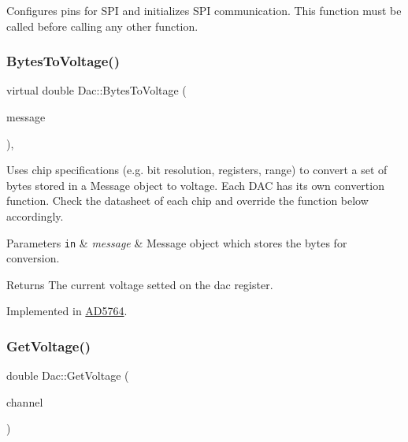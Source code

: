 Configures pins for S\+PI and initializes S\+PI communication. This function must be called before calling any other function. \mbox{\label{classDac_a1df39dc8c6e5b50afd07b6dd8a6b9300}} 
\subsubsection{\texorpdfstring{Bytes\+To\+Voltage()}{BytesToVoltage()}}
{\footnotesize\ttfamily virtual double Dac\+::\+Bytes\+To\+Voltage (\begin{DoxyParamCaption}\item[{\mbox{\hyperlink{structspi__utils_1_1Message}{spi\+\_\+utils\+::\+Message}}}]{message }\end{DoxyParamCaption})\hspace{0.3cm}{\ttfamily [protected]}, {}}

Uses chip specifications (e.\+g. bit resolution, registers, range) to convert a set of bytes stored in a Message object to voltage. Each D\+AC has its own convertion function. Check the datasheet of each chip and override the function below accordingly. 
\begin{DoxyParams}[1]{Parameters}
\mbox{\tt in}  & {\em message} & Message object which stores the bytes for conversion. \\
\hline
\end{DoxyParams}
\begin{DoxyReturn}{Returns}
The current voltage setted on the dac register. 
\end{DoxyReturn}


Implemented in \mbox{\hyperlink{classAD5764_a729015992eda059ae615373d1db53823}{A\+D5764}}.

\mbox{\label{classDac_ad51bf5450f03f39a0357398af69f1705}} 
\subsubsection{\texorpdfstring{Get\+Voltage()}{GetVoltage()}}
{\footnotesize\ttfamily double Dac\+::\+Get\+Voltage (\begin{DoxyParamCaption}\item[{uint8\+\_\+t}]{channel }\end{DoxyParamCaption})}

